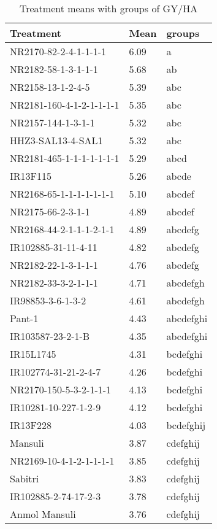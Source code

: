 \documentclass[]{article}
\begin{document}
\begin{longtable}{lll}
\caption{\label{tab:two-fac-groups-tab1}Treatment means with groups of GY/HA}\\
\toprule
Treatment & Mean & groups\\
\midrule
\rowcolor{gray!6}  NR2170-82-2-4-1-1-1-1 & 6.09 & a\\
NR2182-58-1-3-1-1-1 & 5.68 & ab\\
\rowcolor{gray!6}  NR2158-13-1-2-4-5 & 5.39 & abc\\
NR2181-160-4-1-2-1-1-1-1 & 5.35 & abc\\
\rowcolor{gray!6}  NR2157-144-1-3-1-1 & 5.32 & abc\\
\addlinespace
HHZ3-SAL13-4-SAL1 & 5.32 & abc\\
\rowcolor{gray!6}  NR2181-465-1-1-1-1-1-1-1 & 5.29 & abcd\\
IR13F115 & 5.26 & abcde\\
\rowcolor{gray!6}  NR2168-65-1-1-1-1-1-1-1 & 5.10 & abcdef\\
NR2175-66-2-3-1-1 & 4.89 & abcdef\\
\addlinespace
\rowcolor{gray!6}  NR2168-44-2-1-1-1-2-1-1 & 4.89 & abcdefg\\
IR102885-31-11-4-11 & 4.82 & abcdefg\\
\rowcolor{gray!6}  NR2182-22-1-3-1-1-1 & 4.76 & abcdefg\\
NR2182-33-3-2-1-1-1 & 4.71 & abcdefgh\\
\rowcolor{gray!6}  IR98853-3-6-1-3-2 & 4.61 & abcdefgh\\
\addlinespace
Pant-1 & 4.43 & abcdefghi\\
\rowcolor{gray!6}  IR103587-23-2-1-B & 4.35 & abcdefghi\\
IR15L1745 & 4.31 & bcdefghi\\
\rowcolor{gray!6}  IR102774-31-21-2-4-7 & 4.26 & bcdefghi\\
NR2170-150-5-3-2-1-1-1 & 4.13 & bcdefghi\\
\addlinespace
\rowcolor{gray!6}  IR10281-10-227-1-2-9 & 4.12 & bcdefghi\\
IR13F228 & 4.03 & bcdefghij\\
\rowcolor{gray!6}  Mansuli & 3.87 & cdefghij\\
NR2169-10-4-1-2-1-1-1-1 & 3.85 & cdefghij\\
\rowcolor{gray!6}  Sabitri & 3.83 & cdefghij\\
\addlinespace
IR102885-2-74-17-2-3 & 3.78 & cdefghij\\
\rowcolor{gray!6}  Anmol Mansuli & 3.76 & cdefghij\\

\end{longtable}
\end{document}
